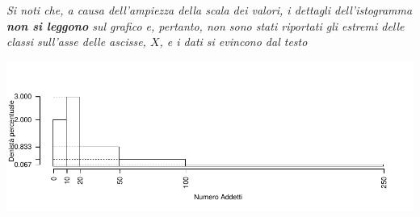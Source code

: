 \documentclass[
  11pt,
]{book}
\theoremstyle{mytheoremstyle}
\theoremstyle{mydefstyle}
\begin{document}
\emph{Si noti che, a causa dell'ampiezza della scala dei valori, i dettagli dell'istogramma \textbf{non si leggono} sul grafico e, pertanto, non sono stati riportati gli estremi delle classi sull'asse delle ascisse, \(X\), e i dati si evincono dal testo}

\begin{center}\includegraphics{Esami_passati_con_soluzioni_files/figure-latex/01-descr-15-1} \end{center}
\end{document}
